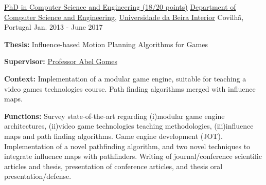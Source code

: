 

\begin{cventries}

\vspace{-0.25cm}

  \cventry
    {\href{https://www.ubi.pt/en/course/849}{PhD in Computer Science and Engineering (18/20 points)}} %
    {\href{https://www.di.ubi.pt/}{Department of Computer Science and Engineering}, \href{http://www.ubi.pt/}{Universidade da Beira Interior}} %
    {Covilh\~{a}, Portugal} %
    {Jan. 2013 - June 2017} %
    {
      \begin{cvitems} %
        \item[] {\textbf{Thesis:} Influence-based Motion Planning Algorithms for Games}
        \item[] {\textbf{Supervisor:} \href{http://www.di.ubi.pt/~agomes/}{Professor Abel Gomes}}
        \item[] {\textbf{Context:} Implementation of a modular game engine, suitable for teaching a video games technologies course.%
        Path finding algorithms merged with influence maps.}
        \item[] {\textbf{Functions:} Survey state-of-the-art regarding (i)modular game engine architectures, (ii)video game technologies teaching methodologies, (iii)influence maps and path finding algorithms. %
        Game engine development (JOT). %
        Implementation of a novel pathfinding algorithm, and two novel techniques to integrate influence maps with pathfinders. Writing of journal/conference scientific articles and thesis, presentation of conference articles, and thesis oral presentation/defense.}

\end{cvitems}}
\end{cventries}
